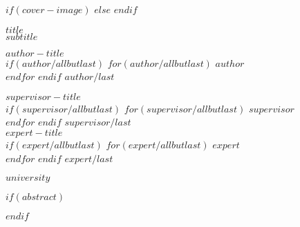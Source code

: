 
\begin{titlepage}
  \begin{center}
    \vspace*{5mm}
    $if(cover-image)$
    \vspace{5mm}
    $else$
    \vspace{40mm}
    $endif$
    
    {\textsf{\textbf{\Huge $title$}}}\\
    \vspace{0.3cm}
    \textsf{\textit{\large $subtitle$}}
    
    \vspace{1cm}
    \begin{multicols}{2}
      \begin{flushleft}
        \textsf{\textbf{$author-title$}\normalsize}\\
        $if(author/allbutlast)$
          $for(author/allbutlast)$
            \textsf{$author$}\\
          $endfor$
        $endif$
        \textsf{$author/last$}\\
      \end{flushleft}

      \vfill\null
      \columnbreak

      \begin{flushright}
        \textsf{\textbf{$supervisor-title$}\normalsize}\\
        $if(supervisor/allbutlast)$
          $for(supervisor/allbutlast)$
            \textsf{$supervisor$}\\
          $endfor$
        $endif$
        \textsf{$supervisor/last$}\\[0.4cm]

        \textsf{\textbf{$expert-title$}\normalsize}\\
        $if(expert/allbutlast)$
          $for(expert/allbutlast)$
            \textsf{$expert$}\\
          $endfor$
        $endif$
        \textsf{$expert/last$}

      \end{flushright}
    \end{multicols}
    \vfill
    \textsf{$university$}
  \end{center}
  \normalfont
\end{titlepage}

\restoregeometry

$if(abstract)$
\begin{abstract}
$abstract$
\end{abstract}
$endif$
